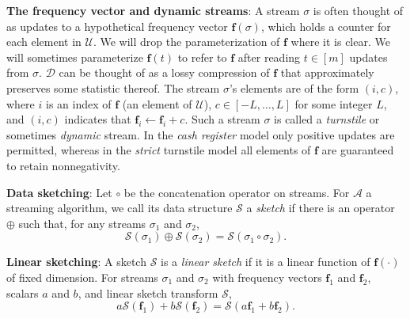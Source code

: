 \documentclass{report}
\begin{document}
\noindent
\textbf{The frequency vector and dynamic streams}:
A stream $\sigma$ is often thought of as updates to a hypothetical frequency vector $\mathbf{f}(\sigma)$, which holds a counter for each element in $\mathcal{U}$.
We will drop the parameterization of $\mathbf{f}$ where it is clear.
We will sometimes parameterize $\mathbf{f}(t)$ to refer to $\mathbf{f}$ after reading $t \in [m]$ updates from $\sigma$.
$\mathcal{D}$ can be thought of as a lossy compression of $\mathbf{f}$ that approximately preserves some statistic thereof.
%
The stream $\sigma$'s elements are of the form $(i, c)$, where $i$ is an index of $\mathbf{f}$ (an element of $\mathcal{U}$), $c \in [-L, \dots, L]$ for some integer $L$, and $(i,c)$ indicates that $\mathbf{f}_i \gets \mathbf{f}_i + c$.
Such a stream $\sigma$ is called a \emph{turnstile} or sometimes \emph{dynamic} stream. 
In the \emph{cash register} model only positive updates are permitted, whereas in the \emph{strict} turnstile model all elements of $\mathbf{f}$ are guaranteed to retain nonnegativity.

\noindent
\textbf{Data sketching}:
Let $\circ$ be the concatenation operator on streams.
For $\mathcal{A}$ a streaming algorithm, we call its data structure $\mathcal{S}$ a \emph{sketch} if there is an operator $\oplus$ such that, for any streams $\sigma_1$ and $\sigma_2$, 
%
\begin{equation} \label{eq:merge}
\mathcal{S}(\sigma_1) \oplus \mathcal{S}(\sigma_2) = \mathcal{S}(\sigma_1 \circ \sigma_2).
\end{equation}
%

\noindent
\textbf{Linear sketching}:
A sketch $\mathcal{S}$ is a \emph{linear sketch} if it is a linear function of $\mathbf{f}(\cdot)$ of fixed dimension.
%
For streams $\sigma_1$ and $\sigma_2$ with frequency vectors $\mathbf{f}_1$ and $\mathbf{f}_2$, scalars $a$ and $b$, and linear sketch transform $\mathcal{S}$, 
%
\begin{equation} \label{eq:linearity}
a\mathcal{S}(\mathbf{f}_1) + b\mathcal{S}(\mathbf{f}_2) = \mathcal{S}(a\mathbf{f}_1 + b\mathbf{f}_2).
\end{equation}
%
\end{document}
